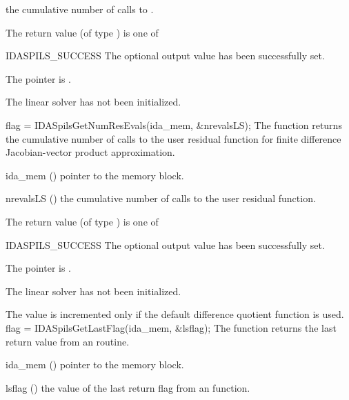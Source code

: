 {{\begin{args}[njvevals]
    the cumulative number of calls to .
  \end{args}
}
{
  The return value  (of type ) is one of
  \begin{args}
  \item[IDASPILS\_SUCCESS] 
    The optional output value has been successfully set.
  \item[\Id{IDASPILS\_MEM\_NULL}]
    The  pointer is .
  \item[\Id{IDASPILS\_LMEM\_NULL}]
    The {\idaspils} linear solver has not been initialized.
  \end{args}
}
{}
{
  flag = IDASpilsGetNumResEvals(ida\_mem, \&nrevalsLS);
}
{
  The function  returns the
  cumulative number of calls to the user residual function for
  finite difference Jacobian-vector product approximation.
}
{
  \begin{args}[nrevalsLS]
  \item[ida\_mem] ()
    pointer to the {\ida} memory block.
  \item[nrevalsLS] ()
    the cumulative number of calls to the user residual function.
  \end{args}
}
{
  The return value  (of type ) is one of
  \begin{args}
  \item[IDASPILS\_SUCCESS] 
    The optional output value has been successfully set.
  \item[\Id{IDASPILS\_MEM\_NULL}]
    The  pointer is .
  \item[\Id{IDASPILS\_LMEM\_NULL}]
    The {\idaspils} linear solver has not been initialized.
  \end{args}
}
{
  The value  is incremented only if the default 
   difference quotient function is used.
}
{
  flag = IDASpilsGetLastFlag(ida\_mem, \&lsflag);
}
{
  The function  returns the
  last return value from an {\idaspils} routine. 
}
{
  \begin{args}
  \item[ida\_mem] ()
    pointer to the {\ida} memory block.
  \item[lsflag] ()
    the value of the last return flag from an {\idaspils} function.
  \end{args}
}}
